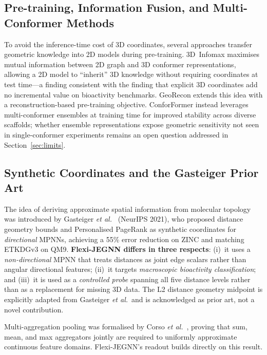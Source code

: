 \documentclass[pdflatex,sn-vancouver-num]{sn-jnl}%
\theoremstyle{thmstyleone}%
\theoremstyle{thmstyletwo}%
\theoremstyle{thmstylethree}%
\begin{document}
\subsection{Pre-training, Information Fusion, and Multi-Conformer Methods}

To avoid the inference-time cost of 3D coordinates, several approaches
transfer geometric knowledge into 2D models during pre-training.
3D~Infomax \cite{stark2022infomax} maximises mutual information between
2D graph and 3D conformer representations, allowing a 2D model to
``inherit'' 3D knowledge without requiring coordinates at test time---a
finding consistent with the finding that explicit 3D coordinates add no
incremental value on bioactivity benchmarks.  GeoRecon
\cite{yan2025georecongraphlevelrepresentationlearning} extends this idea
with a reconstruction-based pre-training objective.  ConforFormer
\cite{klein2026conforformer} instead leverages multi-conformer ensembles
at training time for improved stability across diverse scaffolds; whether
ensemble representations expose geometric sensitivity not seen in
single-conformer experiments remains an open question addressed in
Section~\ref{sec:limits}.

\subsection{Synthetic Coordinates and the Gasteiger Prior Art}
\label{ssec:gasteiger}

The idea of deriving approximate spatial information from molecular
topology was introduced by Gasteiger \emph{et al.}\
\cite{gasteiger2021synthetic} (NeurIPS 2021), who proposed distance
geometry bounds and Personalised PageRank as synthetic coordinates for
\emph{directional} MPNNs, achieving a 55\% error reduction on ZINC and
matching ETKDGv3 on QM9.  \textbf{Flexi-JEGNN differs in three
respects}: (i)~it uses a \emph{non-directional} MPNN that treats
distances as joint edge scalars rather than angular directional features;
(ii)~it targets \emph{macroscopic bioactivity classification}; and
(iii)~it is used as a \emph{controlled probe} spanning all five distance
levels rather than as a replacement for missing 3D data.  The L2
distance geometry midpoint is explicitly adapted from Gasteiger
\emph{et al.}\ and is acknowledged as prior art, not a novel
contribution.

Multi-aggregation pooling was formalised by Corso \emph{et al.}\
\cite{corso2020pna}, proving that sum, mean, and max aggregators jointly
are required to uniformly approximate continuous feature domains.
Flexi-JEGNN's readout builds directly on this result.
\end{document}
